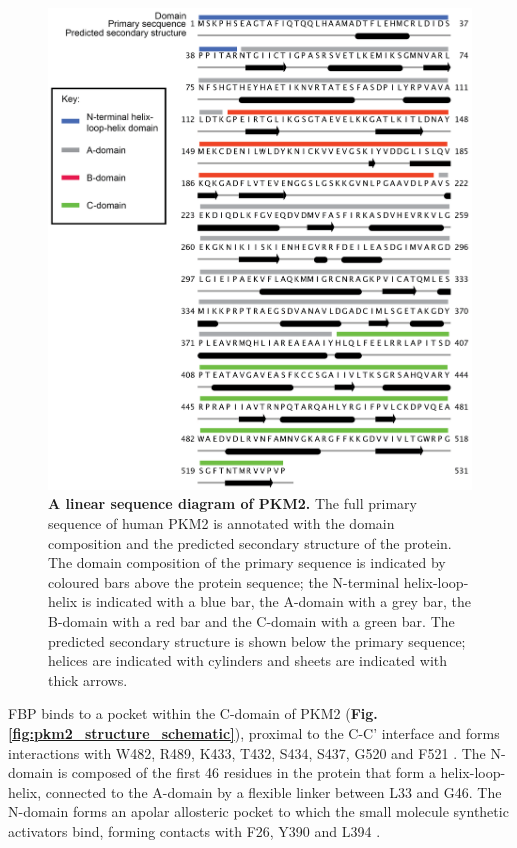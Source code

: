 %
\begin{figure}[!ht]
\includegraphics[scale=0.6]{sequence_diagram.png}
\caption[A linear sequence diagram of PKM2.]{\textbf{A linear sequence diagram of PKM2.} The full primary sequence of human PKM2 is annotated with the domain composition and the predicted secondary structure of the protein. The domain composition of the primary sequence is indicated by coloured bars above the protein sequence; the N-terminal helix-loop-helix is indicated with a blue bar, the A-domain with a grey bar, the B-domain with a red bar and the C-domain with a green bar. The predicted secondary structure is shown below the primary sequence; helices are indicated with cylinders and sheets are indicated with thick arrows.}
\label{fig:pkm2_sequence_schematic}
\end{figure}
%
%
%
FBP binds to a pocket within the C-domain of PKM2 (\textbf{Fig. \ref{fig:pkm2_structure_schematic}}), proximal to the C-C' interface and forms interactions with W482, R489, K433, T432, S434, S437, G520 and F521 \cite{Dombrauckas:2005aa}. The N-domain is composed of the first 46 residues in the protein that form a helix-loop-helix, connected to the A-domain by a flexible linker between L33 and G46. The N-domain forms an apolar allosteric pocket to which the small molecule synthetic activators bind, forming contacts with F26, Y390 and L394 \cite{Anastasiou:2012aa}.
